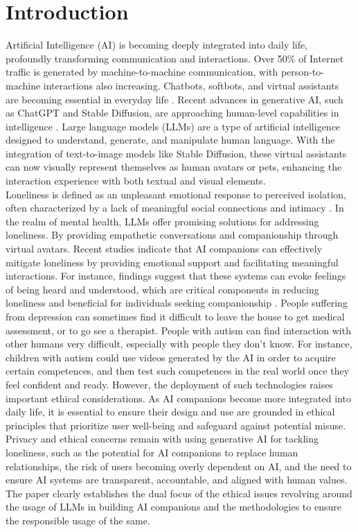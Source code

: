 \section{Introduction}
Artificial Intelligence (AI) is becoming deeply integrated into daily life, profoundly transforming communication and interactions. Over 50\% of Internet traffic is generated by machine-to-machine communication, with person-to-machine interactions also increasing. Chatbots, softbots, and virtual assistants are becoming essential in everyday life \cite{elliott2019culture}. Recent advances in generative AI, such as ChatGPT and Stable Diffusion, are approaching human-level capabilities in intelligence \cite{orru2023human}. Large language models (LLMs) are a type of artificial intelligence designed to understand, generate, and manipulate human language. With the integration of text-to-image models like Stable Diffusion, these virtual assistants can now visually represent themselves as human avatars or pets, enhancing the interaction experience with both textual and visual elements. \\
Loneliness is defined as an unpleasant emotional response to perceived isolation, often characterized by a lack of meaningful social connections and intimacy \cite{lonelinessWiki}. In the realm of mental health, LLMs offer promising solutions for addressing loneliness. By providing empathetic conversations and companionship through virtual avatars. Recent studies indicate that AI companions can effectively mitigate loneliness by providing emotional support and facilitating meaningful interactions. For instance, findings suggest that these systems can evoke feelings of being heard and understood, which are critical components in reducing loneliness \cite{strohmann2023toward} and beneficial for individuals seeking companionship \cite{odekerken2020mitigating}. People suffering from depression can sometimes find it difficult to leave the house to get medical assessment, or to go see a therapist. People with autism can find interaction with other humans very difficult, especially with people they don't know. For instance, children with autism could use videos generated by the AI in order to acquire certain competences, and then test such competences in the real world once they feel confident and ready.
However, the deployment of such technologies raises important ethical considerations. As AI companions become more integrated into daily life, it is essential to ensure their design and use are grounded in ethical principles that prioritize user well-being and safeguard against potential misuse. Privacy and ethical concerns remain with using generative AI for tackling loneliness, such as the potential for AI companions to replace human relationships, the risk of users becoming overly dependent on AI, and the need to ensure AI systems are transparent, accountable, and aligned with human values. \\
The paper clearly establishes the dual focus of the ethical issues revolving around the usage of LLMs in building AI companions and the methodologies to ensure the responsible usage of the same.

